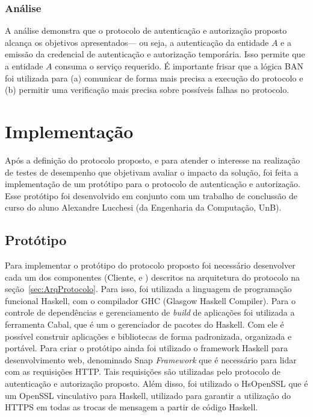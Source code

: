 \subsubsection{Análise}

A análise demonstra que o protocolo de autenticação e autorização proposto alcança os objetivos apresentados--- ou seja, a autenticação da entidade ${A}$ e a emissão da credencial de autenticação e autorização temporária. Isso permite que a entidade ${A}$ consuma o serviço requerido. É importante frisar que a lógica BAN foi utilizada para (a) comunicar de forma mais precisa a execução do protocolo e (b) permitir uma verificação mais precisa sobre possíveis falhas no protocolo. %


\section{Implementação}\label{sec:implementacao}

Após a definição do protocolo proposto, e para atender o interesse na realização de testes de desempenho que objetivam avaliar o impacto da solução, foi feita a implementação de um protótipo para o protocolo de autenticação e autorização. Esse protótipo foi desenvolvido em conjunto com um trabalho de conclussão de curso do aluno Alexandre Lucchesi (da Engenharia da Computação, UnB).

\subsection{Protótipo}

Para implementar o protótipo do protocolo proposto foi necessário desenvolver cada um dos componentes (Cliente, \servidorAA e \servidorRest) descritos na arquitetura do protocolo na seção~\ref{sec:ArqProtocolo}. Para isso, foi utilizada a linguagem de programação funcional Haskell, com o compilador GHC (Glasgow Haskell Compiler).
Para o controle de dependências e gerenciamento de \emph{build} de aplicações foi utilizada a ferramenta Cabal, que é um o gerenciador de pacotes do Haskell. Com ele é possível construir aplicações e bibliotecas de forma padronizada, organizada e portável. Para criar o protótipo ainda foi utilizado o framework Haskell para desenvolvimento web, denominado Snap \emph{Framework} que é necessário para lidar com as requisições HTTP. Tais requisições são utilizadas pelo protocolo de autenticação e autorização proposto. Além disso, foi utilizado o HsOpenSSL que é um OpenSSL vinculativo para Haskell, utilizado para garantir a utilização do HTTPS em todas as trocas de mensagem a partir de código Haskell.

